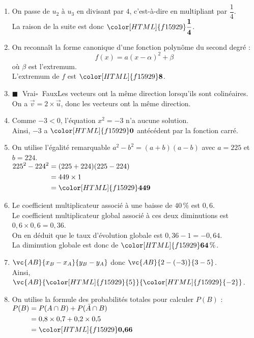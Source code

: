 \documentclass[a4paper,11pt,landscape,exos]{nsi} %
\begin{document}
\begin{multicols}{2}
\begin{enumerate}[]
\item On passe de $u_{2}$ à $u_{3}$ en divisant par $4$, c'est-à-dire en multipliant par $\dfrac{1}{4}$.\\
    La raison de la suite est donc ${\color[HTML]{f15929}\boldsymbol{\dfrac{1}{4}}}$.
\item On reconnaît la forme canonique d'une fonction polynôme du second degré :\[f(x)=a(x-\alpha)^2+\beta\] où $\beta$ est l'extremum.\\
    L'extremum de $f$ est ${\color[HTML]{f15929}\boldsymbol{8}}$.
\item  
    
    	$\blacksquare\;$ Vrai\qquad $\square\;$ Faux\qquad Les vecteurs ont la même direction lorsqu'ils sont colinéaires.\\
    On a $\vec{v}=2\times \vec{u}$, donc les vecteurs ont la même direction. 
\item Comme $-3 < 0$, l'équation $x^2=-3$  n'a aucune solution. \\
    Ainsi, $-3$ a ${\color[HTML]{f15929}\boldsymbol{0}}$ antécédent par la fonction carré.
\item On utilise l'égalité remarquable $a^2-b^2=(a+b)(a-b)$ avec $a=225$ et $b=224$.\\
    $\begin{aligned}
    225^2-224^2&=(225+224)(225-224)\\
    &=449\times 1\\
    &={\color[HTML]{f15929}\boldsymbol{449}}
    \end{aligned}$
\item  Le coefficient multiplicateur  associé à une baisse de $40\,\%$ est $0{,}6$.\\
    Le coefficient multiplicateur global associé à ces deux diminutions est $0{,}6\times 0{,}6= 0{,}36$.\\
    On en déduit que le taux d'évolution globale est $0{,}36-1=-0{,}64$.\\
    La diminution globale est donc de ${\color[HTML]{f15929}\boldsymbol{64}} \,\%$.
\item $\vc{AB}{x_B-x_A}{y_B-y_A}$ donc $\vc{AB}{2-(-3)}{3-5}$.\\
         Ainsi, $\vc{AB}{\color[HTML]{f15929}{5}}{\color[HTML]{f15929}{-2}}$. 
\item On utilise la formule des probabilités totales pour calculer $P(B)$ :\\
              $\begin{aligned}
              P(B)&=P(A\cap B)+P(\bar{A}\cap B)\\
              &=0{,}8\times 0{,}7+0{,}2\times 0{,}5\\
    &={\color[HTML]{f15929}\boldsymbol{0{,}66}}
              \end{aligned}$
   
      \vfill\null
      \columnbreak
\end{enumerate}
$\quad$\\
\end{multicols}
\end{document}
